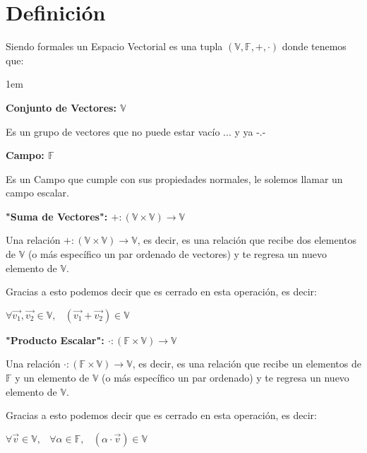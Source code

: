\documentclass[12pt, fleqn]{report}                             %
\newenvironment{Indentation}[1][0.75em]                         %
    {\begin{adjustwidth}{#1}{}}                                     %
    {\end{adjustwidth}}                                             %
\DeclareMathOperator \Space {\quad}                             %
\DeclareMathOperator \MiniSpace {\;}                            %
\begin{document}
        \section{Definición}

            Siendo formales un Espacio Vectorial es una tupla $(\mathbb{V}, \mathbb{F}, +, \cdot)$ donde tenemos que:
            \begin{Indentation}[1em]
            \begin{itemize}
            \small{
                
                \item
                    \textbf{Conjunto de Vectores: $\mathbb{V}$}

                    Es un grupo de vectores que no puede estar vacío ... y ya -.- 

                \item
                    \textbf{Campo: $\mathbb{F}$}

                    Es un Campo que cumple con sus propiedades normales, le solemos llamar un campo escalar.

                \item
                    \textbf{"Suma de Vectores": $+: (\mathbb{V} \times  \mathbb{V}) \to \mathbb{V}$}

                    Una relación $+: (\mathbb{V} \times  \mathbb{V}) \to \mathbb{V}$, es decir, es una relación
                    que recibe dos elementos de $\mathbb{V}$ (o más específico un par ordenado de vectores) y te
                    regresa un nuevo elemento de $\mathbb{V}$.

                    Gracias a esto podemos decir que es cerrado en esta operación, es decir:

                    $\forall \vec{v_1}, \vec{v_2} \in \mathbb{V},
                        \MiniSpace (\vec{v_1} + \vec{v_2}) \in \mathbb{V}$                            

                \item
                    \textbf{"Producto Escalar": $\cdot: (\mathbb{F} \times  \mathbb{V}) \to \mathbb{V}$}

                    Una relación $\cdot: (\mathbb{F} \times  \mathbb{V}) \to \mathbb{V}$, es decir, es una relación
                    que recibe un elementos de $\mathbb{F}$ y un elemento de $\mathbb{V}$
                    (o más específico un par ordenado) y te regresa un nuevo elemento de $\mathbb{V}$.

                    Gracias a esto podemos decir que es cerrado en esta operación, es decir:

                    $\forall \vec{v} \in \mathbb{V}, \MiniSpace
                        \forall \alpha \in \mathbb{F}, \MiniSpace
                            (\alpha \cdot \vec{v}) \in \mathbb{V}$  
            }
            \end{itemize}
            \end{Indentation}
\end{document}
